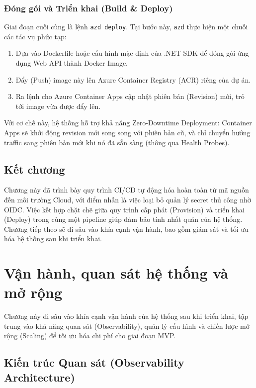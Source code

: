 \documentclass[a4paper,12pt,twoside]{report}
\begin{document}
\subsection{Đóng gói và Triển khai (Build \& Deploy)}
Giai đoạn cuối cùng là lệnh \texttt{azd deploy}. Tại bước này, \texttt{azd} thực hiện một chuỗi các tác vụ phức tạp:
\begin{enumerate}
    \item Dựa vào Dockerfile hoặc cấu hình mặc định của .NET SDK để đóng gói ứng dụng Web API thành Docker Image.
    \item Đẩy (Push) image này lên Azure Container Registry (ACR) riêng của dự án.
    \item Ra lệnh cho Azure Container Apps cập nhật phiên bản (Revision) mới, trỏ tới image vừa được đẩy lên.
\end{enumerate}

Với cơ chế này, hệ thống hỗ trợ khả năng Zero-Downtime Deployment: Container Apps sẽ khởi động revision mới song song với phiên bản cũ, và chỉ chuyển hướng traffic sang phiên bản mới khi nó đã sẵn sàng (thông qua Health Probes).

\section*{Kết chương}

Chương này đã trình bày quy trình CI/CD tự động hóa hoàn toàn từ mã nguồn đến môi trường Cloud, với điểm nhấn là việc loại bỏ quản lý secret thủ công nhờ OIDC. Việc kết hợp chặt chẽ giữa quy trình cấp phát (Provision) và triển khai (Deploy) trong cùng một pipeline giúp đảm bảo tính nhất quán của hệ thống. Chương tiếp theo sẽ đi sâu vào khía cạnh vận hành, bao gồm giám sát và tối ưu hóa hệ thống sau khi triển khai.


\chapter{Vận hành, quan sát hệ thống và mở rộng}

Chương này đi sâu vào khía cạnh vận hành của hệ thống sau khi triển khai, tập trung vào khả năng quan sát (Observability), quản lý cấu hình và chiến lược mở rộng (Scaling) để tối ưu hóa chi phí cho giai đoạn MVP.

\section{Kiến trúc Quan sát (Observability Architecture)}
\end{document}
